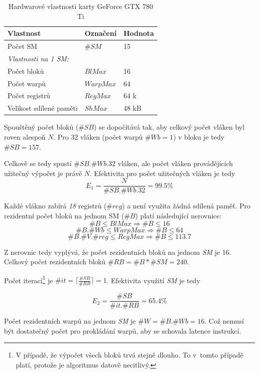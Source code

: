 \begin{table}[h!]
    \centering
    \begin{tabular}{lll}
        \hline
        Vlastnost                & Označení & Hodnota \\
        \hline
        Počet SM                 & $\#SM$    & 15      \\
        \hline
        \emph{Vlastnosti na 1 SM:} &         &		   \\
        \hline
        Počet bloků              & $BlMax$   & 16      \\
        Počet warpů              & $WarpMax$ & 64      \\
        Počet registrů           & $RegMax$  & 64 k    \\
        Velikost sdílené paměti  & $ShMax$   & 48 kB   \\
        \hline
    \end{tabular}
    \caption{Hardwarové vlastnosti karty GeForce GTX 780 Ti \cite{w:cuda}}
    \label{tab:cuda:hw}
\end{table}


Spouštěný počet bloků ($\#SB$) se dopočítává tak, aby celkový počet vláken byl roven alespoň $N$. Pro $32$ vláken (počet warpů $\#Wb = 1$) v bloku je tedy $\#SB = 157$.

Celkově se tedy spustí $\#SB . \#Wb . 32$ vláken, ale počet vláken provádějících užitečný výpočet je právě $N$. Efektivita pro počet užitečných vláken je tedy
$$ E_1 = \frac{N}{\#SB . \#Wb . 32} = 99.5 \% $$


Každé vlákno zabírá \emph{18} registrů ($\#reg$) a není využita žádná sdílená paměť. Pro rezidentní počet 
bloků na jednom SM ($\#B$)  platí následující nerovnice:
$$               \#B \leq BlMax   \Rightarrow  \#B \leq 16    $$
$$        \#B . \#Wb \leq WarpMax \Rightarrow  \#B \leq 64    $$
$$ \#B . \#V . \#reg \leq RegMax  \Rightarrow  \#B \leq 113.7 $$

Z nerovnic tedy vyplývá, že počet rezidentních bloků na jednom \emph{SM} je 16. Celkový počet rezidentních bloků $ \#RB = \#B * \#SM = 240 $.

Počet iterací\footnote{V případě, že výpočet všech bloků trvá stejně dlouho. To v~tomto případě platí, protože je algoritmus datově necitlivý.}
je $ \#it = \lceil \frac{\#SB}{\#RB} \rceil = 1 $. Efektivita využití \emph{SM} je tedy 

$$ E_2 = \frac{\#SB}{\#it . \#RB } = 65.4 \% $$

Počet rezidentních warpů na jednom \emph{SM} je  $ \#W = \#B . \#Wb = 16 $. Což nemusí být dostatečný počet pro prokládání
warpů, aby se schovala latence instrukcí.

